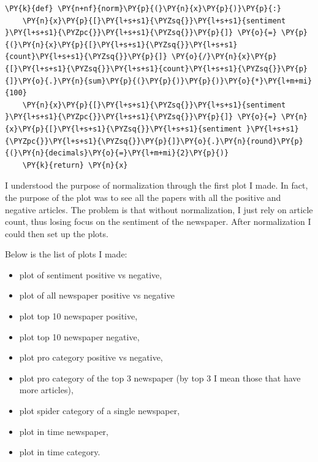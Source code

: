     \begin{tcolorbox}[breakable, size=fbox, boxrule=1pt, pad at break*=1mm,colback=cellbackground, colframe=cellborder]
\begin{Verbatim}[commandchars=\\\{\},fontsize=\footnotesize]
\PY{k}{def} \PY{n+nf}{norm}\PY{p}{(}\PY{n}{x}\PY{p}{)}\PY{p}{:}
    \PY{n}{x}\PY{p}{[}\PY{l+s+s1}{\PYZsq{}}\PY{l+s+s1}{sentiment }\PY{l+s+s1}{\PYZpc{}}\PY{l+s+s1}{\PYZsq{}}\PY{p}{]} \PY{o}{=} \PY{p}{(}\PY{n}{x}\PY{p}{[}\PY{l+s+s1}{\PYZsq{}}\PY{l+s+s1}{count}\PY{l+s+s1}{\PYZsq{}}\PY{p}{]} \PY{o}{/}\PY{n}{x}\PY{p}{[}\PY{l+s+s1}{\PYZsq{}}\PY{l+s+s1}{count}\PY{l+s+s1}{\PYZsq{}}\PY{p}{]}\PY{o}{.}\PY{n}{sum}\PY{p}{(}\PY{p}{)}\PY{p}{)}\PY{o}{*}\PY{l+m+mi}{100}   
    \PY{n}{x}\PY{p}{[}\PY{l+s+s1}{\PYZsq{}}\PY{l+s+s1}{sentiment }\PY{l+s+s1}{\PYZpc{}}\PY{l+s+s1}{\PYZsq{}}\PY{p}{]} \PY{o}{=} \PY{n}{x}\PY{p}{[}\PY{l+s+s1}{\PYZsq{}}\PY{l+s+s1}{sentiment }\PY{l+s+s1}{\PYZpc{}}\PY{l+s+s1}{\PYZsq{}}\PY{p}{]}\PY{o}{.}\PY{n}{round}\PY{p}{(}\PY{n}{decimals}\PY{o}{=}\PY{l+m+mi}{2}\PY{p}{)}
    \PY{k}{return} \PY{n}{x}  
\end{Verbatim}
\end{tcolorbox}

I understood the purpose of normalization through the first plot I made. In fact, the purpose of the plot was to see all the papers with all the positive and negative articles. The problem is that without normalization, I just rely on article count, thus losing focus on the sentiment of the newspaper.
After normalization I could then set up the plots.

Below is the list of plots I made:
\begin{itemize}
    \item plot of sentiment positive vs negative,
    \item plot of all newspaper positive vs negative
    \item plot top 10 newspaper positive,
    \item plot top 10 newspaper negative,
    \item plot pro category positive vs negative,
    \item plot pro category of the top 3 newspaper (by top 3 I mean those that have more articles),
    \item plot spider category of a single newspaper, 
    \item plot in time newspaper,
    \item plot in time category.
\end{itemize}

